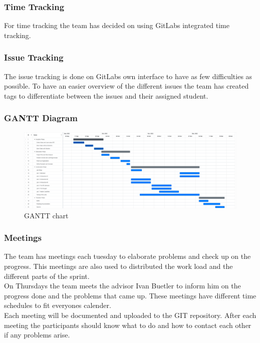 \subsubsection*{Time Tracking}
For time tracking the team has decided on using GitLabs integrated time tracking. 

\subsubsection*{Issue Tracking}
The issue tracking is done on GitLabs own interface to have as few difficulties as possible. To have an easier overview of the different issues the team has created tags to differentiate between the issues and their assigned student. 

\subsubsection*{GANTT Diagram}
\begin{figure}
    \includegraphics[width=\linewidth]{resources/gantt.png}
    \caption{GANTT chart}
    \label{gantt_figure}
  \end{figure}

\subsubsection*{Meetings}
The team has meetings each tuesday to elaborate problems and check up on the progress. This meetings are also used to distributed the work load and the different parts of the sprint. \\
On Thursdays the team meets the advisor Ivan Buetler to inform him on the progress done and the problems that came up. These meetings have different time schedules to fit everyones calender. \\
Each meeting will be documented and uploaded to the GIT repository. After each meeting the participants should know what to do and how to contact each other if any problems arise.


